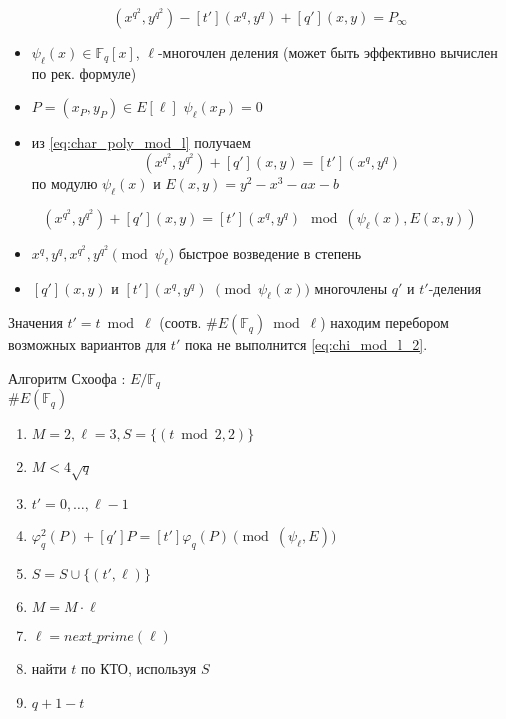 \documentclass{beamer}
\begin{document}
\begin{frame}
\begin{equation}
    \label{eq:char_poly_mod_l}
(x^{q^2}, y^{q^2}) - [t'] (x^{q}, y^{q}) + [q'](x,y) = P_\infty
\end{equation}
\begin{itemize}
    \item $\psi_\ell(x) \in \mathbb{F}_q[x]$, $\ell$-многочлен деления (может быть эффективно вычислен по рек. формуле)
    \item $P = (x_P, y_P) \in E[\ell]$ \structure{$\iff$} $\psi_\ell(x_P) = 0$
    \item из \eqref{eq:char_poly_mod_l} получаем
    \[(x^{q^2}, y^{q^2}) + [q'](x,y) = [t'] (x^{q}, y^{q})\]
    по модулю $\psi_\ell(x)$ и $E(x,y) = y^2 - x^3 - a x - b$
\end{itemize}
\end{frame}

\begin{frame}
    \begin{equation}
    \label{eq:chi_mod_l_2}
    (x^{q^2}, y^{q^2}) + [q'](x,y) = [t'] (x^{q}, y^{q}) 
    ~\bmod (\psi_\ell(x), E(x,y))
    \end{equation}
    \begin{itemize}
        \item $x^q, y^q, x^{q^2}, y^{q^2} \pmod{\psi_\ell} $ \structure{$\implies$} быстрое возведение в степень
        \item $[q'](x,y)$ и $[t'](x^q, y^q)$ $\pmod{\psi_\ell(x)}$ \structure{$\implies$} многочлены $q'$ и $t'$-деления
    \end{itemize}
    \vspace{1em}
    Значения $t' = t\bmod{\ell}$ (соотв. $\#E(\mathbb{F}_q)\bmod{\ell}$) находим перебором возможных вариантов для $t'$ пока не выполнится \eqref{eq:chi_mod_l_2}.
\end{frame}

\begin{frame}{Алгоритм Схоофа}
: $E/\mathbb{F}_q$\\
 $\#E(\mathbb{F}_q)$\\
\begin{enumerate}
    \item $M = 2, \ell = 3, S = \{(t \bmod{2}, 2)\}$
    \item {} $M < 4 \sqrt{q}$ 
    \item \quad {} $t' = 0, \ldots, \ell-1$ 
    \item \quad \quad {} $\varphi_q^2(P) + [q'] P = [t']\varphi_q(P) \pmod{(\psi_\ell, E)}$  \\
    \quad \quad \quad {}
    \item \quad $S = S \cup \{ (t',\ell) \}$
    \item \quad $M = M \cdot \ell$
    \item \quad $\ell = next\_prime(\ell)$
    \item найти $t$ по КТО, используя $S$
    \item {} $q + 1 - t$
\end{enumerate}
\end{frame}
\end{document}
